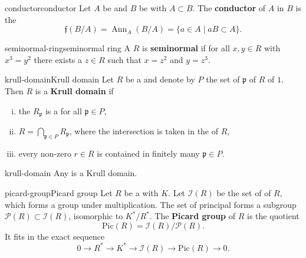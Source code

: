 \begin{topic}{conductor}{conductor}
    Let $A$ be and $B$ be  with $A \subset B$. The \textbf{conductor} of $A$ in $B$ is the 
    \[ \mathfrak{f}(B/A) = \operatorname{Ann}_A(B/A) = \{ a \in A \mid a B \subset A \} . \]
\end{topic}

\begin{topic}{seminormal-ring}{seminormal ring}
    A   $R$ is \textbf{seminormal} if for all $x, y \in R$ with $x^3 = y^2$ there exists a $z \in R$ such that $x = z^2$ and $y = z^3$.
\end{topic}

\begin{topic}{krull-domain}{Krull domain}
    Let $R$ be a  and denote by $P$ the set of  $\mathfrak{p}$ of $R$ of  $1$. Then $R$ is a \textbf{Krull domain} if
    \begin{enumerate}[(i)]
        \item the  $R_\mathfrak{p}$ is a  for all $\mathfrak{p} \in P$,
        \item $R = \bigcap_{\mathfrak{p} \in P} R_\mathfrak{p}$, where the intersection is taken in the  of $R$,
        \item every non-zero $r \in R$ is contained in finitely many $\mathfrak{p} \in P$.
    \end{enumerate}
\end{topic}

\begin{example}{krull-domain}
    Any  is a Krull domain.
\end{example}

\begin{topic}{picard-group}{Picard group}
    Let $R$ be a  with  $K$. Let $\mathcal{I}(R)$ be the set of  of $R$, which forms a group under multiplication. The set of principal  forms a subgroup $\mathcal{P}(R) \subset \mathcal{I}(R)$, isomorphic to $K^* / R^*$. The \textbf{Picard group} of $R$ is the quotient
    \[ \text{Pic}(R) = \mathcal{I}(R) / \mathcal{P}(R) . \]
    It fits in the exact sequence
    \[ 0 \to R^* \to K^* \to \mathcal{I}(R) \to \text{Pic}(R) \to 0 . \]
\end{topic}

